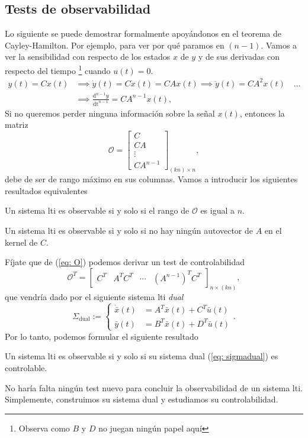 \subsection{Tests de observabilidad}
Lo siguiente se puede demostrar formalmente apoyándonos en el teorema de Cayley-Hamilton. Por ejemplo, para ver por qué paramos en $(n-1)$. Vamos a ver la sensibilidad con respecto de los estados $x$ de $y$ y de sus derivadas con respecto del tiempo \footnote{Observa como $B$ y $D$ no juegan ningún papel aquí} cuando $u(t) = 0$.
\begin{align}
	y(t) = Cx(t) &\implies \dot y(t) = C\dot x(t) = CAx(t) \implies \ddot y(t) = C A^2 x(t) \quad \dots \nonumber \\ &\implies \frac{\mathrm{d}^{n-1}y}{\mathrm{dt}^{n-1}} = CA^{n-1}x(t), \nonumber
\end{align}
Si no queremos perder ninguna información sobre la señal $x(t)$, entonces la matriz
\begin{equation}
	\mathcal{O} = \begin{bmatrix}C \\ CA \\ \vdots \\ CA^{n-1}\end{bmatrix}_{(kn)\times n}, \label{eq: O}
\end{equation}
debe de ser de rango máximo en sus columnas. Vamos a introducir los siguientes resultados equivalentes
\begin{theorem}
	Un sistema lti es observable si y solo si el rango de $\mathcal{O}$ es igual a $n$.
\end{theorem}
\begin{theorem}
	Un sistema lti es observable si y solo si no hay ningún autovector de $A$ en el kernel de $C$.
\end{theorem}

Fíjate que de (\ref{eq: O}) podemos derivar un test de controlabilidad
\begin{equation}
	\mathcal{O}^T = \begin{bmatrix}C^T & A^TC^T & \cdots & (A^{n-1})^TC^T \end{bmatrix}_{n \times (kn)}, 
\end{equation}
que vendría dado por el siguiente sistema lti \emph{dual}
\begin{equation}
	\Sigma_{\text{dual}} := \begin{cases}
		\dot{\bar x}(t) &= A^T \bar x(t) + C^T \bar u(t) \\
		\bar y(t) &= B^T\bar x(t) + D^T\bar u(t)
	\end{cases}.
\label{eq: sigmadual}
\end{equation}
Por lo tanto, podemos formular el siguiente resultado
\begin{theorem}
	Un sistema lti es observable si y solo si su sistema dual (\ref{eq: sigmadual}) es controlable.
\end{theorem}
No haría falta ningún test nuevo para concluir la observabilidad de un sistema lti. Simplemente, construimos su sistema dual y estudiamos su controlabilidad.

